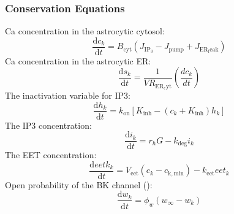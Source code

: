 \subsubsection{Conservation Equations}
\gls{Ca} concentration in the astrocytic cytosol:
\begin{equation} \label{eqRN:ckInt}
\dfrac{\mathrm{d}c_k}{\mathrm{d}t}= B_{\mathrm{cyt}}(J_{\mathrm{IP_3}}-J_{\mathrm{pump}}+J_{\mathrm{ER_leak}})
\end{equation}
%
\gls{Ca} concentration in the astrocytic \gls{ER}:
\begin{equation} \label{eqRN:skInt}
\dfrac{\mathrm{d}s_k}{\mathrm{d}t}= \frac{1}{VR_{\mathrm{ER_cyt}}}(\frac{dc_k}{dt})
\end{equation}
%
The inactivation variable for \gls{IP3}:
\begin{equation} \label{eqRN:hkInt}
\dfrac{\mathrm{d}h_k}{\mathrm{d}t}= k_{\mathrm{on}}[K_{\mathrm{inh}}-(c_k+K_{\mathrm{inh}})h_k]
\end{equation}
%
The \gls{IP3} concentration:
\begin{equation} \label{eqRN:ikInt}
\dfrac{\mathrm{d}i_k}{\mathrm{d}t}= r_hG-k_{\mathrm{deg}}i_k
\end{equation}
%
The EET concentration:
\begin{equation} \label{eqRN:eetkInt}
\dfrac{\mathrm{d}eetk_k}{\mathrm{d}t}= V_{\mathrm{eet}}(c_k-c_{\mathrm{k,min}})-k_{\mathrm{eet}}eet_k
\end{equation}
%
Open probability of the BK channel (\pers):
\begin{equation} \label{eqRN:dwkdt}
\frac{\mathrm{d}w_{k}}{\mathrm{d}t} = \phi_{w} \left(w_{\infty}-w_{k} \right) 
\end{equation}

